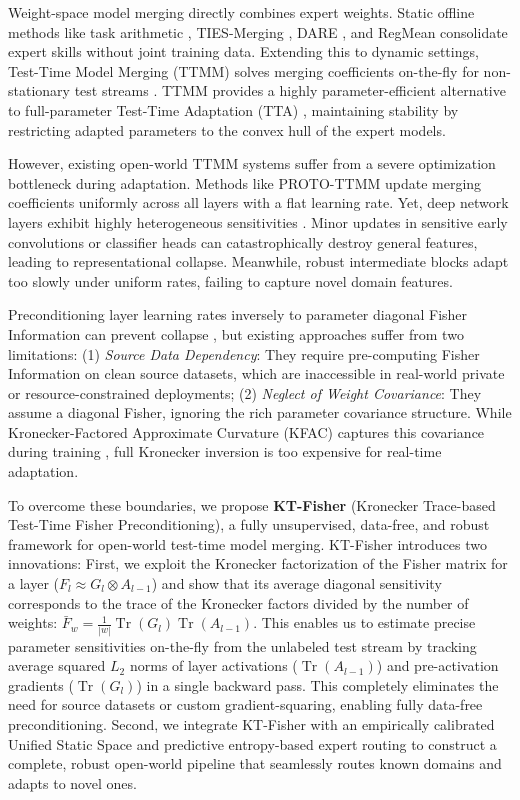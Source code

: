 \documentclass{article}
\theoremstyle{plain}
\theoremstyle{definition}
\theoremstyle{remark}
\begin{document}
Weight-space model merging directly combines expert weights. Static offline methods like task arithmetic \cite{ilharco2023editing}, TIES-Merging \cite{yadav2023ties}, DARE \cite{yu2023dare}, and RegMean \cite{jin2023regmean} consolidate expert skills without joint training data. Extending this to dynamic settings, Test-Time Model Merging (TTMM) solves merging coefficients on-the-fly for non-stationary test streams \cite{yang2024adamerging, yang2025local}. TTMM provides a highly parameter-efficient alternative to full-parameter Test-Time Adaptation (TTA) \cite{wang2021tent, boudiaf2022parameter}, maintaining stability by restricting adapted parameters to the convex hull of the expert models.

However, existing open-world TTMM systems suffer from a severe optimization bottleneck during adaptation. Methods like PROTO-TTMM \cite{zhao2024dynamic} update merging coefficients uniformly across all layers with a flat learning rate. Yet, deep network layers exhibit highly heterogeneous sensitivities \cite{he2016deep}. Minor updates in sensitive early convolutions or classifier heads can catastrophically destroy general features, leading to representational collapse. Meanwhile, robust intermediate blocks adapt too slowly under uniform rates, failing to capture novel domain features.

Preconditioning layer learning rates inversely to parameter diagonal Fisher Information can prevent collapse \cite{matena2022merging}, but existing approaches suffer from two limitations: (1) \textit{Source Data Dependency}: They require pre-computing Fisher Information on clean source datasets, which are inaccessible in real-world private or resource-constrained deployments; (2) \textit{Neglect of Weight Covariance}: They assume a diagonal Fisher, ignoring the rich parameter covariance structure. While Kronecker-Factored Approximate Curvature (KFAC) captures this covariance during training \cite{martens2015optimizing}, full Kronecker inversion is too expensive for real-time adaptation.

To overcome these boundaries, we propose \textbf{KT-Fisher} (Kronecker Trace-based Test-Time Fisher Preconditioning), a fully unsupervised, data-free, and robust framework for open-world test-time model merging. KT-Fisher introduces two innovations:
First, we exploit the Kronecker factorization of the Fisher matrix for a layer ($F_l \approx G_l \otimes A_{l-1}$) and show that its average diagonal sensitivity corresponds to the trace of the Kronecker factors divided by the number of weights: $\bar{F}_w = \frac{1}{|w|} \operatorname{Tr}(G_l)\operatorname{Tr}(A_{l-1})$. This enables us to estimate precise parameter sensitivities on-the-fly from the unlabeled test stream by tracking average squared $L_2$ norms of layer activations ($\operatorname{Tr}(A_{l-1})$) and pre-activation gradients ($\operatorname{Tr}(G_l)$) in a single backward pass. This completely eliminates the need for source datasets or custom gradient-squaring, enabling fully data-free preconditioning.
Second, we integrate KT-Fisher with an empirically calibrated Unified Static Space and predictive entropy-based expert routing to construct a complete, robust open-world pipeline that seamlessly routes known domains and adapts to novel ones.
\end{document}
